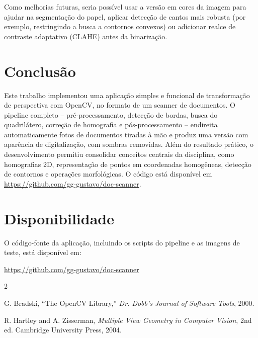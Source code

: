 \documentclass[conference]{IEEEtran}
\begin{document}
Como melhorias futuras, seria possível usar a versão em cores da imagem para ajudar na segmentação do papel, aplicar detecção de cantos mais robusta (por exemplo, restringindo a busca a contornos convexos) ou adicionar realce de contraste adaptativo (CLAHE) antes da binarização.

\section{Conclusão}

Este trabalho implementou uma aplicação simples e funcional de transformação de perspectiva com OpenCV, no formato de um scanner de documentos. O pipeline completo -- pré-processamento, detecção de bordas, busca do quadrilátero, correção de homografia e pós-processamento -- endireita automaticamente fotos de documentos tiradas à mão e produz uma versão com aparência de digitalização, com sombras removidas. Além do resultado prático, o desenvolvimento permitiu consolidar conceitos centrais da disciplina, como homografias 2D, representação de pontos em coordenadas homogêneas, detecção de contornos e operações morfológicas. O código está disponível em \url{https://github.com/gg-gustavo/doc-scanner}.

\section*{Disponibilidade}

O código-fonte da aplicação, incluindo os scripts do pipeline e as imagens de teste, está disponível em:
\begin{center}
\url{https://github.com/gg-gustavo/doc-scanner}
\end{center}

\begin{thebibliography}{2}

G. Bradski, ``The OpenCV Library,'' \emph{Dr. Dobb's Journal of Software Tools}, 2000.

R. Hartley and A. Zisserman, \emph{Multiple View Geometry in Computer Vision}, 2nd ed. Cambridge University Press, 2004.

\end{thebibliography}
\end{document}
